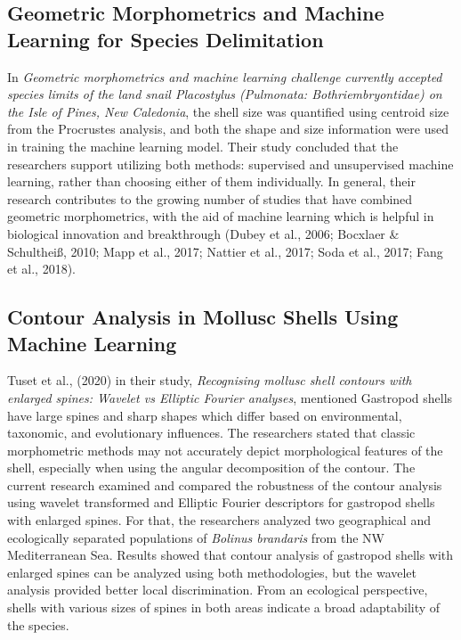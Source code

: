\subsection{Geometric Morphometrics and Machine Learning for Species Delimitation}
In \textit{Geometric morphometrics and machine learning challenge currently accepted species limits of the land snail Placostylus (Pulmonata: Bothriembryontidae) on the Isle of Pines, New Caledonia}, the shell size was quantified using centroid size from the Procrustes analysis, and both the shape and size information were used in training the machine learning model. Their study concluded that the researchers support utilizing both methods: supervised and unsupervised machine learning, rather than choosing either of them individually. In general, their research contributes to the growing number of studies that have combined geometric morphometrics, with the aid of machine learning which is helpful in biological innovation and breakthrough (Dubey et al., 2006; Bocxlaer \& Schultheiß, 2010; Mapp et al., 2017; Nattier et al., 2017; Soda et al., 2017; Fang et al., 2018).

\subsection{Contour Analysis in Mollusc Shells Using Machine Learning}
Tuset et al., (2020) in their study, \textit{Recognising mollusc shell contours with enlarged spines: Wavelet vs Elliptic Fourier analyses}, mentioned Gastropod shells have large spines and sharp shapes which differ based on environmental, taxonomic, and evolutionary influences. The researchers stated that classic morphometric methods may not accurately depict morphological features of the shell, especially when using the angular decomposition of the contour. The current research examined and compared the robustness of the contour analysis using wavelet transformed and Elliptic Fourier descriptors for gastropod shells with enlarged spines. For that, the researchers analyzed two geographical and ecologically separated populations of \textit{Bolinus brandaris} from the NW Mediterranean Sea. Results showed that contour analysis of gastropod shells with enlarged spines can be analyzed using both methodologies, but the wavelet analysis provided better local discrimination. From an ecological perspective, shells with various sizes of spines in both areas indicate a broad adaptability of the species.

